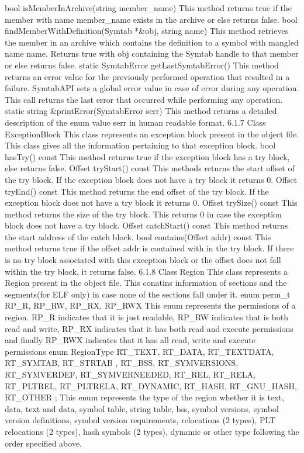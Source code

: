 bool isMemberInArchive(string member_name)
This method returns true if the member with name member_name exists in the archive or else returns false.
bool findMemberWithDefinition(Symtab *&obj, string name)
This method retrieves the member in an archive which contains the definition to a symbol with mangled name name.
Returns true with obj containing the Symtab handle to that member or else returns false.
static SymtabError getLastSymtabError()
This method returns an error value for the previously performed operation that resulted in a failure. 
SymtabAPI sets a global error value in case of error during any operation. This call returns the last error that occurred while performing any operation.
static string &printError(SymtabError serr)
This method returns a detailed description of the enum value serr in human readable format.
6.1.7 Class ExceptionBlock
This class represents an exception block present in the object file. This class gives all the information pertaining to that exception block.
bool hasTry() const
This method returns true if the exception block has a try block, else returns false.
Offset tryStart() const
This methods returns the start offset of the try block.
If the exception block does not have a try block it returns 0.
Offset tryEnd() const
This method returns the end offset of the try block.
If the exception block does not have a try block it returns 0.
Offset trySize() const
This method returns the size of the try block. This returns 0 in case the exception block does not have a try block.
Offset catchStart() const
This method returns the start address of the catch block.
bool contains(Offset addr) const
This method returns true if the offset addr is contained with in the try block. If there is no try block associated with this exception block or the offset does not fall within the try block, it returns false.
6.1.8 Class Region
This class represents a Region present in the object file. This conatins information of sections and the segments(for ELF only) in case none of the sections fall under it. 
enum perm_t{
RP_R, RP_RW, RP_RX, RP_RWX }
This enum represents the permissions of a region. RP_R indicates that it is just readable, RP_RW indicates that is both read and write, RP_RX indicates that it has both read and execute permissions and finally RP_RWX indicates that it has all read, write and execute permissions
enum RegionType { 
RT_TEXT, RT_DATA, RT_TEXTDATA, RT_SYMTAB, RT_STRTAB ,
RT_BSS, RT_SYMVERSIONS, RT_SYMVERDEF, RT_SYMVERNEEDED, 
RT_REL, RT_RELA, RT_PLTREL, RT_PLTRELA, RT_DYNAMIC, RT_HASH, RT_GNU_HASH, RT_OTHER };
This enum represents the type of the region whether it is text, data, text and data, symbol table, string table, bss, symbol versions, symbol version definitions, symbol version requirements, relocations (2 types), PLT relocations (2 types), hash symbols (2 types), dynamic or other type following the order specified above.
